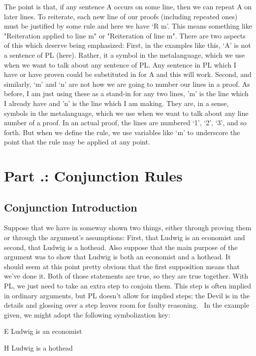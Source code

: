 The point is that, if any sentence A occurs on some line, then we can repeat A on later lines. To reiterate, each new line of our proofs (including repeated ones) must be justified by some rule and here we have ‘R m’. This means something like "Reiteration applied to line m" or "Reiteration of line m". There are two aspects of this which deserve being emphasized: First, in the examples like this, ‘A’ is not a sentence of PL (here). Rather, it a symbol in the metalanguage, which we use when we want to talk about any sentence of PL. Any sentence in PL which I have or have proven could be substituted in for A and this will work. Second, and similarly, ‘m’ and ‘n’ are not how we are going to number our lines in a proof. As before, I am just using these as a stand-in for any two lines, 'm' is the line which I already have and 'n' is the line which I am making. They are, in a sense, symbols in the metalanguage, which we use when we want to talk about any line number of a proof. In an actual proof, the lines are numbered ‘1’, ‘2’, ‘3’, and so forth. But when we define the rule, we use variables like ‘m’ to underscore the point that the rule may be applied at any point.
\section{Part \thechapcount.\theseccount: Conjunction Rules}
\subsection{Conjunction Introduction}

Suppose that we have in someway shown two things, either through proving them or through the argument's assumptions: First, that Ludwig is an economist and second, that Ludwig is a hothead. Also suppose that the main purpose of the argument was to show that Ludwig is both an economist and a hothead. It should seem at this point pretty obvious that the first supposition means that we've done it. Both of those statements are true, so they are true together. With PL, we just need to take an extra step to conjoin them. This step is often implied in ordinary arguments, but PL doesn't allow for implied steps; the Devil is in the details and glossing over a step leaves room for faulty reasoning.  In the example given, we might adopt the following symbolization key:
\begin{ekey}
\item[E] Ludwig is an economist
\item[H] Ludwig is a hothead
\end{ekey}

